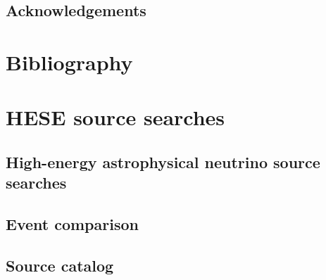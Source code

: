 \documentclass[oneside, letterpaper, 10pt, oldfontcommands]{memoir}
\begin{document}
\frontmatter

\thetitlepage
\cleardoublepage
\setcounter{page}{1}


\section{Acknowledgements}


\clearpage
\tableofcontents\clearpage

\mainmatter












%


\chapter*[Bibliography]{Bibliography}
\printbibliography[heading=none]

\clearpage
\newpage
\appendix

\begingroup
\graphicspath{{results/HESE_Final_Paper/}}
\chapter{HESE source searches}
\section{High-energy astrophysical neutrino source searches\label{sec:sources}}

\section{Event comparison\label{sec:comparison}}

\section{Source catalog\label{sec:source_catalog}}

\end{document}
